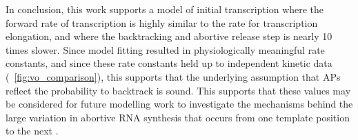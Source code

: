 In conclusion, this work supports a model of initial transcription where the
forward rate of transcription is highly similar to the rate for transcription
elongation, and where the backtracking and abortive release step is nearly 10
times slower. Since model fitting resulted in physiologically meaningful rate
constants, and since these rate constants held up to independent kinetic data
(\FIG~\ref{fig:vo_comparison}), this supports that the underlying assumption
that APs reflect the probability to backtrack is sound. This supports that
these values may be considered for future modelling work to investigate the
mechanisms behind the large variation in abortive RNA synthesis that occurs
from one template position to the next \cite{hsu_initial_2006}.
